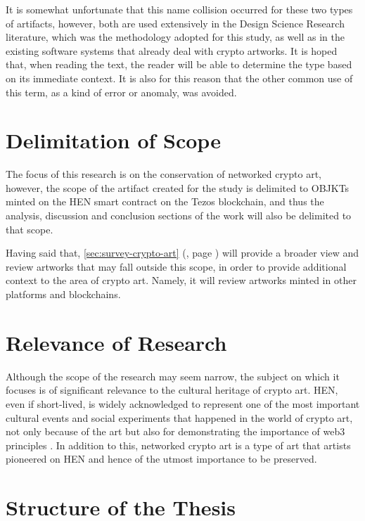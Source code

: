 \vspace{0.5cm}

It is somewhat unfortunate that this name collision occurred for these two types of artifacts, however, both are used extensively in the Design Science Research literature, which was the methodology adopted for this study, as well as in the existing software systems that already deal with crypto artworks. It is hoped that, when reading the text, the reader will be able to determine the type based on its immediate context. It is also for this reason that the other common use of this term, as a kind of error or anomaly, was avoided. 

\section{Delimitation of Scope}

The focus of this research is on the conservation of networked crypto art, however, the scope of the artifact created for the study is delimited to OBJKTs minted on the HEN smart contract on the Tezos blockchain, and thus the analysis, discussion and conclusion sections of the work will also be delimited to that scope.

Having said that, \autoref{sec:survey-crypto-art} (, page \pageref{sec:survey-crypto-art})  will provide a broader view and review artworks that may fall outside this scope, in order to provide additional context to the area of crypto art. Namely, it will review artworks minted in other platforms and blockchains.

\section{Relevance of Research}

Although the scope of the research may seem narrow, the subject on which it focuses is of significant relevance to the cultural heritage of crypto art.
HEN, even if short-lived, is widely acknowledged to represent one of the most important cultural events and social experiments that happened in the world of crypto art, not only because of the art but also for demonstrating the importance of web3 principles \cite{rcsEarlyDaysHic2023} \cite{baileyHicNuncBrings2021} \cite{drubayHowHicNunc2021}.
In addition to this, networked crypto art is a type of art that artists pioneered on HEN and hence of the utmost importance to be preserved.

\section{Structure of the Thesis}

